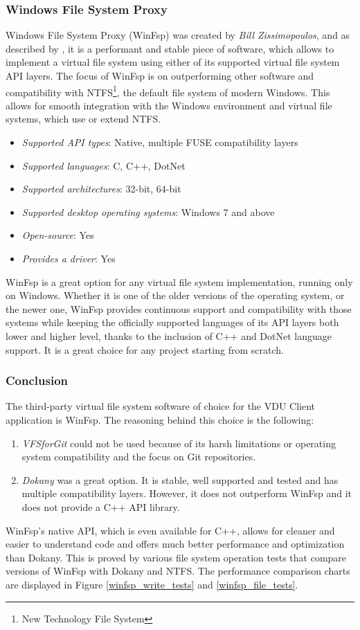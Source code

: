 \subsubsection{Windows File System Proxy}
Windows File System Proxy (WinFsp) was created by \textit{Bill Zissimopoulos}, and as described by \cite{GitWinFsp}, it is a performant and stable piece of software, which allows to implement a virtual file system using either of its supported virtual file system API layers. The focus of WinFsp is on outperforming other software and compatibility with NTFS\footnote{New Technology File System}, the default file system of modern Windows. This allows for smooth integration with the Windows environment and virtual file systems, which use or extend NTFS.
\begin{itemize}
    \item \textit{Supported API types}: Native, multiple FUSE compatibility layers
    \item \textit{Supported languages}: C, C++, DotNet
    \item \textit{Supported architectures}: 32-bit, 64-bit
    \item \textit{Supported desktop operating systems}: Windows 7 and above
    \item \textit{Open-source}: Yes
    \item \textit{Provides a driver}: Yes
\end{itemize}


WinFsp is a great option for any virtual file system implementation, running only on Windows. Whether it is one of the older versions of the operating system, or the newer one, WinFsp provides continuous support and compatibility with those systems while keeping the officially supported languages of its API layers both lower and higher level, thanks to the inclusion of C++ and DotNet language support. It is a great choice for any project starting from scratch.

\subsubsection{Conclusion}
The third-party virtual file system software of choice for the VDU Client application is WinFsp. The reasoning behind this choice is the following: 
\begin{enumerate}
    \item \textit{VFSforGit} could not be used because of its harsh limitations or operating system compatibility and the focus on Git repositories.
    \item \textit{Dokany} was a great option. It is stable, well supported and tested and has multiple compatibility layers. However, it does not outperform WinFsp and it does not provide a C++ API library.
\end{enumerate}
WinFsp's native API, which is even available for C++, allows for cleaner and easier to understand code and offers much better performance and optimization than Dokany. This is proved by various file system operation tests that compare versions of WinFsp with Dokany and NTFS. The performance comparison charts are displayed in Figure \ref{winfsp_write_tests} and \ref{winfsp_file_tests}.

